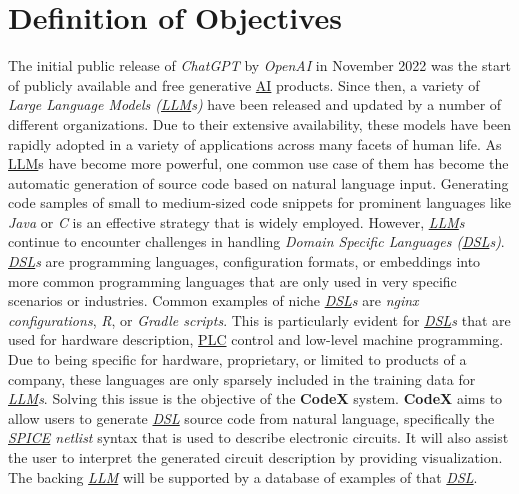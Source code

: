
\chapter{Definition of Objectives}\label{ch:definition-of-objectives}

The initial public release of \textit{ChatGPT} by \textit{OpenAI} in November 2022 was the start of publicly available and free generative \hyperref[abr:AI]{AI} products.
Since then, a variety of \textit{Large Language Models (\hyperref[abr:LLM]{LLM}s)} have been released and updated by a number of different organizations.
Due to their extensive availability, these models have been rapidly adopted in a variety of applications across many facets of human life.
As \hyperref[abr:LLM]{LLM}s have become more powerful, one common use case of them has become the automatic generation of source code based on natural language input. \newline
Generating code samples of small to medium-sized code snippets for prominent languages like \textit{Java} or \textit{C} is an effective strategy that is widely employed.
However, \textit{\hyperref[abr:LLM]{LLM}s} continue to encounter challenges in handling \textit{Domain Specific Languages (\hyperref[abr:DSL]{DSL}s)}. \textit{\hyperref[abr:DSL]{DSL}s} are programming languages, configuration formats, or embeddings into more common programming languages that are only used in very specific scenarios or industries.
Common examples of niche \textit{\hyperref[abr:DSL]{DSL}s} are \textit{nginx configurations}, \textit{R}, or \textit{Gradle scripts}. \newline
This is particularly evident for \textit{\hyperref[abr:DSL]{DSL}s} that are used for hardware description, \hyperref[abr:PLC]{PLC} control and low-level machine programming.
Due to being specific for hardware, proprietary, or limited to products of a company, these languages are only sparsely included in the training data for \textit{\hyperref[abr:LLM]{LLM}s}. \newline
Solving this issue is the objective of the \textbf{CodeX} system. \textbf{CodeX} aims to allow users to generate \textit{\hyperref[abr:DSL]{DSL}} source code from natural language, specifically the \textit{\hyperref[abr:SPICE]{SPICE} netlist} syntax that is used to describe electronic circuits.
It will also assist the user to interpret the generated circuit description by providing visualization.
The backing \textit{\hyperref[abr:LLM]{LLM}} will be supported by a database of examples of that \textit{\hyperref[abr:DSL]{DSL}}.


